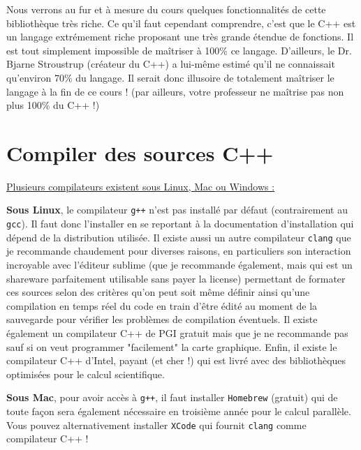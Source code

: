 Nous verrons au fur et à mesure du cours quelques fonctionnalités de cette bibliothèque très riche. Ce qu'il faut cependant comprendre, c'est que le C++ est un langage extrémement riche proposant une très grande étendue de fonctions. Il est tout simplement impossible de maîtriser à 100\% ce langage. D'ailleurs, le Dr. Bjarne Stroustrup (créateur du C++) a lui-même estimé qu'il ne connaissait qu'environ 70\% du langage. Il serait donc illusoire de totalement maîtriser le langage à la fin de ce cours ! (par ailleurs, votre professeur ne maîtrise pas non plus 100\% du C++ !)

\section{Compiler des sources C++}

\underline{Plusieurs compilateurs existent sous Linux, Mac ou Windows :}

\textbf{Sous Linux}, le compilateur \texttt{g++} n'est pas installé par défaut (contrairement au \texttt{gcc}). Il faut donc l'installer en se reportant à la documentation d'installation qui dépend de la distribution utilisée. Il existe aussi un autre compilateur \texttt{clang} que je recommande chaudement pour diverses raisons, en particuliers son interaction incroyable avec l'éditeur sublime (que je recommande également, mais qui est un shareware parfaitement utilisable sans payer la license) permettant de formater ces sources selon des critères qu'on peut soit même définir ainsi qu'une compilation en temps réel du code en train d'être édité au moment de la sauvegarde pour vérifier les problèmes de compilation éventuels. Il existe également un compilateur C++ de PGI gratuit mais que je ne recommande pas sauf si on veut programmer "facilement" la carte graphique. Enfin, il existe le compilateur C++ d'Intel, payant (et cher !) qui est livré avec des bibliothèques optimisées pour le calcul scientifique.

\textbf{Sous Mac}, pour avoir accès à \texttt{g++}, il faut installer \texttt{Homebrew} (gratuit) qui de toute façon sera également nécessaire en troisième année pour le calcul parallèle. Vous pouvez alternativement installer \texttt{XCode} qui fournit \texttt{clang} comme compilateur C++ !

